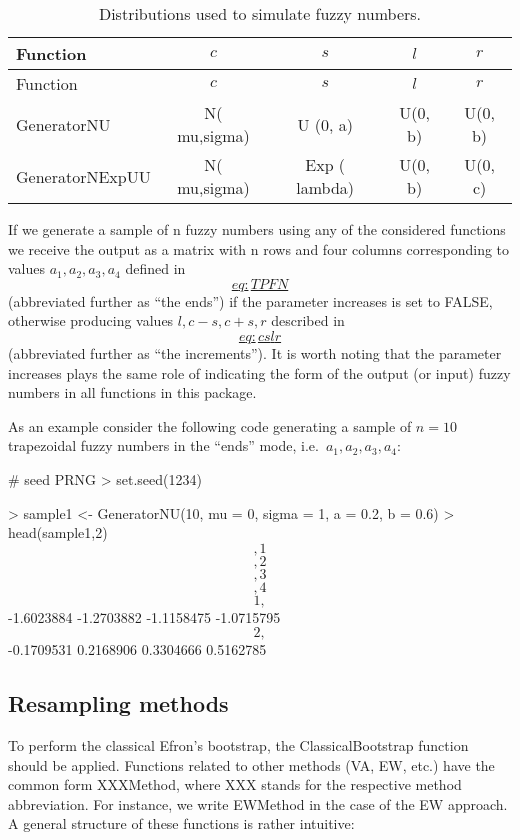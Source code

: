 \hypertarget{tab100}{}
\begin{longtable}[]{@{}lcccc@{}}
\caption{Distributions used to simulate fuzzy numbers.}\tabularnewline
\toprule\noalign{}
Function & \(c\) & \(s\) & \(l\) & \(r\) \\
\midrule\noalign{}
\endfirsthead
\toprule\noalign{}
Function & \(c\) & \(s\) & \(l\) & \(r\) \\
\midrule\noalign{}
\endhead
\bottomrule\noalign{}
\endlastfoot
GeneratorNU & N( mu,sigma) & U (0, a) & U(0, b) & U(0, b) \\
GeneratorNExpUU & N( mu,sigma) & Exp ( lambda) & U(0, b) & U(0, c) \\
\end{longtable}

If we generate a sample of n fuzzy numbers using any of the considered
functions we receive the output as a matrix with n rows and four columns
corresponding to values \(a_1, a_2, a_3, a_4\) defined in
\protect\hyperlink{eq:TPFN}{\[eq:TPFN\]}
(abbreviated further as ``the ends'') if the parameter increases is set to
FALSE, otherwise producing values \(l, c-s, c+s, r\) described in
\protect\hyperlink{eq:cslr}{\[eq:cslr\]}
(abbreviated further as ``the increments''). It is worth noting that the
parameter increases plays the same role of indicating the form of the
output (or input) fuzzy numbers in all functions in this package.

As an example consider the following code generating a sample of \(n=10\)
trapezoidal fuzzy numbers in the ``ends'' mode, i.e.~\(a_1,a_2, a_3, a_4\):

\begin{example}
\# seed PRNG \textgreater{} set.seed(1234)

\textgreater{} sample1 \textless- GeneratorNU(10, mu = 0, sigma = 1, a = 0.2, b = 0.6) \textgreater{}
head(sample1,2) \[,1\] \[,2\] \[,3\] \[,4\] \[1,\] -1.6023884 -1.2703882
-1.1158475 -1.0715795 \[2,\] -0.1709531 0.2168906 0.3304666 0.5162785
\end{example}

\hypertarget{resampling-methods}{%
\subsection{Resampling methods}\label{resampling-methods}}

To perform the classical Efron's bootstrap, the ClassicalBootstrap
function should be applied. Functions related to other methods (VA, EW,
etc.) have the common form XXXMethod, where XXX stands for the
respective method abbreviation. For instance, we write EWMethod in the
case of the EW approach. A general structure of these functions is
rather intuitive:

